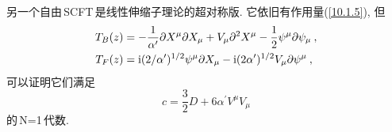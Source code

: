 另一个自由\,SCFT\,是线性伸缩子理论的超对称版. 它依旧有作用量(\ref{10.1.5}), 但
\begin{subequations}
    \begin{align}
        T_{B}(z)&=-\frac{1}{\alpha^{\prime}} \partial X^{\mu}\partial X_{\mu} +V_{\mu}\partial^{2}X^{\mu} -\frac{1}{2}\psi^{\mu}\partial\psi_{\mu} \:,\label{10.1.22a} \\
        T_{F}(z)&= \mathrm{i}(2/\alpha^{\prime})^{1/2}\psi^{\mu}\partial X_{\mu}-\mathrm{i} (2\alpha^{\prime})^{1/2}V_{\mu}\partial\psi^{\mu} \:, \label{10.1.22b} 
    \end{align} \label{10.1.22}
\end{subequations}
可以证明它们满足
\begin{equation}
    c=\frac{3}{2}D+6\alpha^{\prime} V^{\mu}V_{\mu}  \label{10.1.23}
\end{equation}
的\,N=1\,代数.
